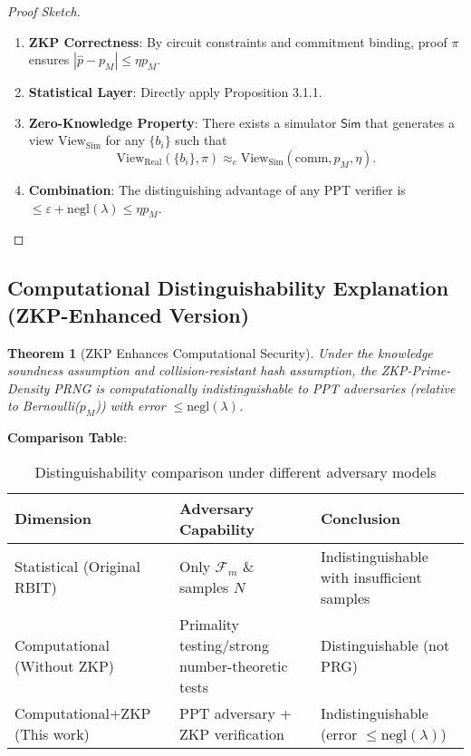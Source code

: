 \documentclass[12pt]{article}
\theoremstyle{plain}
\newtheorem{theorem}{Theorem}[section]
\theoremstyle{definition}
\begin{document}
\begin{proof}[Proof Sketch]
\begin{enumerate}
\item \textbf{ZKP Correctness}: By circuit constraints and commitment binding, proof $\pi$ ensures $|\hat{p} - p_M| \le \eta p_M$.

\item \textbf{Statistical Layer}: Directly apply Proposition 3.1.1.

\item \textbf{Zero-Knowledge Property}: There exists a simulator $\mathsf{Sim}$ that generates a view $\text{View}_{\text{Sim}}$ for any $\{b_i\}$ such that
\[
\text{View}_{\text{Real}}(\{b_i\}, \pi) \approx_c \text{View}_{\text{Sim}}(\text{comm}, p_M, \eta).
\]

\item \textbf{Combination}: The distinguishing advantage of any PPT verifier is $\le \varepsilon + \text{negl}(\lambda) \le \eta p_M$.
\end{enumerate}
\end{proof}

\subsection{Computational Distinguishability Explanation (ZKP-Enhanced Version)}

\begin{theorem}[ZKP Enhances Computational Security]
Under the knowledge soundness assumption and collision-resistant hash assumption, the ZKP-Prime-Density PRNG is computationally indistinguishable to PPT adversaries (relative to Bernoulli($p_M$)) with error $\le \text{negl}(\lambda)$.
\end{theorem}

\textbf{Comparison Table}:

\begin{table}[h]
\centering
\caption{Distinguishability comparison under different adversary models}
\begin{tabular}{@{}lll@{}}
\toprule
Dimension & Adversary Capability & Conclusion \\
\midrule
Statistical (Original RBIT) & Only $\mathcal{F}_m$ \& samples $N$ & Indistinguishable with insufficient samples \\
Computational (Without ZKP) & Primality testing/strong number-theoretic tests & Distinguishable (not PRG) \\
Computational+ZKP (This work) & PPT adversary + ZKP verification & Indistinguishable (error $\le \text{negl}(\lambda)$) \\
\bottomrule
\end{tabular}
\end{table}
\end{document}
